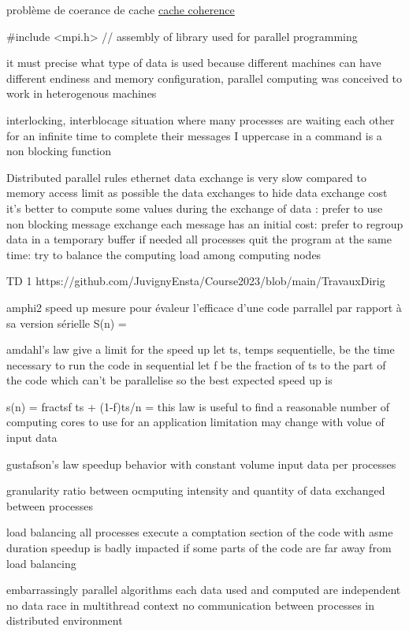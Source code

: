 \documentclass{article}
\begin{document}
problème de coerance de cache
\href{https://en.wikipedia.org/wiki/Cache_coherence}{cache coherence}

#include <mpi.h> // assembly of library used for parallel programming

it must precise what type of data is used because different machines can have different endiness and memory configuration, parallel computing was conceived to work in heterogenous machines



interlocking, interblocage
situation where many processes are waiting each other for an infinite time to complete their messages
I uppercase in a command is a non blocking function


Distributed parallel rules
    ethernet data exchange is very slow compared to memory access limit as possible the data exchanges
    to hide data exchange cost it's better to compute some values during the exchange of data : prefer to use non blocking message exchange
    each message has an initial cost: prefer to regroup data in a temporary buffer if needed
    all processes quit the program at the same time: try to balance the computing load among computing nodes


TD 1
https://github.com/JuvignyEnsta/Course2023/blob/main/TravauxDirig%

amphi2
speed up
mesure pour évaleur l'efficace d'une code parrallel par rapport à sa version sérielle
S(n) = 

amdahl's law
give a limit for the speed up 
let ts, temps sequentielle, be the time necessary to run the code in sequential
let f be the fraction of ts to the part of the code which can't be parallelise
so the best expected speed up is

s(n) =  frac{ts}{f ts + (1-f)ts/n} = 
this law is useful to find a reasonable number of computing cores to use for an application 
limitation may change with volue of input data 


gustafson's law
speedup behavior with constant volume input data per processes


granularity
ratio between ocmputing intensity and quantity of data exchanged between processes

load balancing
all processes execute a comptation section of the code with asme duration
speedup is badly impacted if some parts of the code are far away from load balancing


embarrassingly parallel algorithms
each data used and computed are independent
no data race in multithread context
no communication between processes in distributed environment
\end{document}
